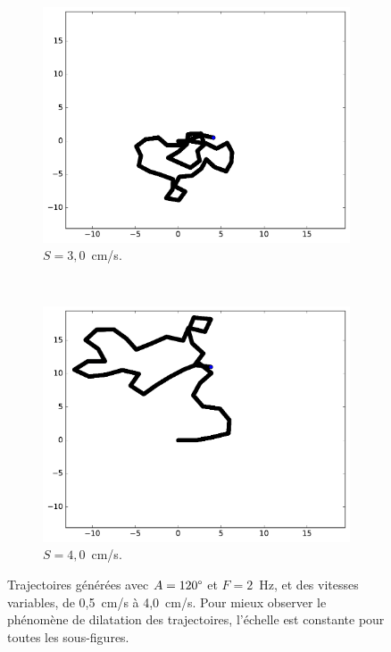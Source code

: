 \begin{figure}[htb]
\begin{subfigure}[t]{\subImgWmo}
			\includegraphics[width=\textwidth]{figures/ch3/spTraj_3_0_120_2}
			\caption[$S = 3,0$]{$S = 3,0$~cm/s.}
			\label{fig:spTraj_3_0_120_2}
		\end{subfigure}
		~
		\begin{subfigure}[t]{\subImgWmo}
			\centering
			\includegraphics[width=\textwidth]{figures/ch3/spTraj_4_0_120_2}
			\caption[$S = 4,0$]{$S = 4,0$~cm/s.}
			\label{fig:spTraj_4_0_120_2}
		\end{subfigure}
		\caption[Effet des vitesses]{Trajectoires générées avec $A = 120\degree$ et $F = 2$~Hz, et des vitesses variables, de 0,5~cm/s à 4,0~cm/s. Pour mieux observer le phénomène de \og dilatation \fg{} des trajectoires, l'échelle est constante pour toutes les sous-figures.}
		\label{fig:spEffect}
	\end{figure}
	
